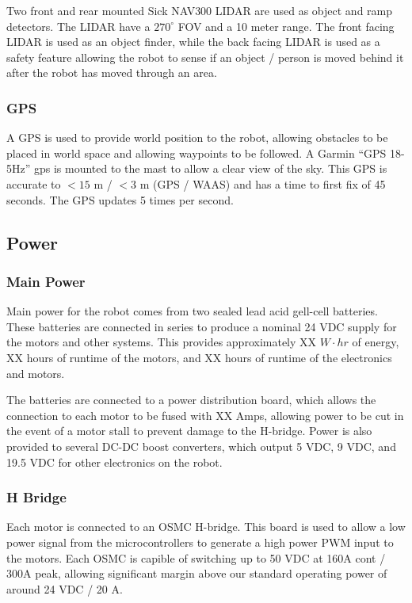 Two front and rear mounted Sick NAV300 LIDAR are used as object and ramp detectors. The LIDAR have a $270^{\circ}$ FOV and a 10 meter range. The front facing LIDAR is used as an object finder, while the back facing LIDAR is used as a safety feature allowing the robot to sense if an object / person is moved behind it after the robot has moved through an area.

\subsubsection{GPS}

A GPS is used to provide world position to the robot, allowing obstacles to be placed in world space and allowing waypoints to be followed. A Garmin ``GPS 18-5Hz'' gps is mounted to the mast to allow a clear view of the sky. This GPS is accurate to $<15$ m / $<3$ m (GPS / WAAS) and has a time to first fix of 45 seconds. The GPS updates 5 times per second.

\subsection{Power}

\subsubsection{Main Power}

Main power for the robot comes from two sealed lead acid gell-cell batteries. These batteries are connected in series to produce a nominal 24 VDC supply for the motors and other systems. This provides approximately XX $W \cdot hr$ of energy, XX hours of runtime of the motors, and XX hours of runtime of the electronics and motors.

The batteries are connected to a power distribution board, which allows the connection to each motor to be fused with XX Amps, allowing power to be cut in the event of a motor stall to prevent damage to the H-bridge. Power is also provided to several DC-DC boost converters, which output 5 VDC, 9 VDC, and 19.5 VDC for other electronics on the robot.

\subsubsection{H Bridge}

Each motor is connected to an OSMC H-bridge. This board is used to allow a low power signal from the microcontrollers to generate a high power PWM input to the motors. Each OSMC is capible of switching up to 50 VDC at 160A cont / 300A peak, allowing significant margin above our standard operating power of around 24 VDC / 20 A.

